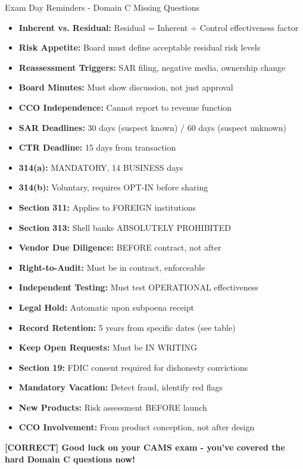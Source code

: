 \documentclass[11pt,a4paper]{beamer}
\newcommand{\greennote}[1]{\textcolor{green!50!black}{\textbf{[CORRECT] #1}}}
\begin{document}
\begin{frame}{Exam Day Reminders - Domain C Missing Questions}
\begin{itemize}
\item \textbf{Inherent vs. Residual:} Residual = Inherent ÷ Control effectiveness factor
\item \textbf{Risk Appetite:} Board must define acceptable residual risk levels
\item \textbf{Reassessment Triggers:} SAR filing, negative media, ownership change
\item \textbf{Board Minutes:} Must show discussion, not just approval
\item \textbf{CCO Independence:} Cannot report to revenue function
\item \textbf{SAR Deadlines:} 30 days (suspect known) / 60 days (suspect unknown)
\item \textbf{CTR Deadline:} 15 days from transaction
\item \textbf{314(a):} MANDATORY, 14 BUSINESS days
\item \textbf{314(b):} Voluntary, requires OPT-IN before sharing
\item \textbf{Section 311:} Applies to FOREIGN institutions
\item \textbf{Section 313:} Shell banks ABSOLUTELY PROHIBITED
\item \textbf{Vendor Due Diligence:} BEFORE contract, not after
\item \textbf{Right-to-Audit:} Must be in contract, enforceable
\item \textbf{Independent Testing:} Must test OPERATIONAL effectiveness
\item \textbf{Legal Hold:} Automatic upon subpoena receipt
\item \textbf{Record Retention:} 5 years from specific dates (see table)
\item \textbf{Keep Open Requests:} Must be IN WRITING
\item \textbf{Section 19:} FDIC consent required for dishonesty convictions
\item \textbf{Mandatory Vacation:} Detect fraud, identify red flags
\item \textbf{New Products:} Risk assessment BEFORE launch
\item \textbf{CCO Involvement:} From product conception, not after design
\end{itemize}
\vspace{0.3cm}
\centering
\greennote{Good luck on your CAMS exam - you've covered the hard Domain C questions now!}
\end{frame}
\end{document}
